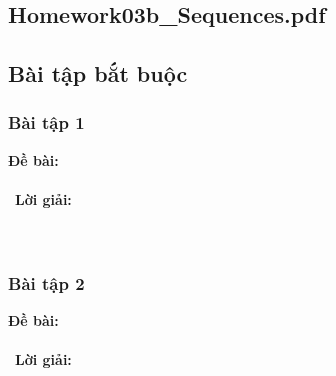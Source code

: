 \documentclass[a4paper]{article}
\begin{document}
\begin{enumerate}
\section{Homework03b\_Sequences.pdf} 

\subsection{Bài tập bắt buộc}
\subsubsection{Bài tập 1}
\textbf{Đề bài:} 
\\\ \\\
\textbf{Lời giải:} \\\ \\\
\clearpage
\subsubsection{Bài tập 2}
\textbf{Đề bài:} 
\\\ \\\
\textbf{Lời giải:} \\\ \\\
\clearpage

\end{enumerate}
\end{document}
